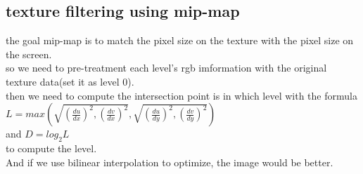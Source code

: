 \documentclass[acmtog]{acmart}
\begin{document}
\subsection{texture filtering using mip-map}
the goal mip-map is to match the pixel size on the texture with the pixel size on the screen.\\
so we need to pre-treatment each level's rgb imformation with the original texture data(set it as level 0).\\
then we need to compute the intersection point is in which level with the formula\\
$L = max(\sqrt{(\frac{du}{dx})^2,(\frac{dv}{dx})^2},\sqrt{(\frac{du}{dy})^2,(\frac{dv}{dy})^2})$\\
and $D = log_2L$\\
to compute the level.\\
And if we use bilinear interpolation to optimize, the image would be better.\\
\end{document}
